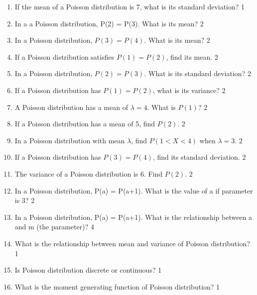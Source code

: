 \documentclass[a4paper,oneside]{book}
\begin{document}
\begin{enumerate}
\item If the mean of a Poisson distribution is 7, what is its standard deviation? \hfill 1

\item In a a Poisson distribution, P(2) = P(3). What is its mean?  \hfill 2

\item In a Poisson distribution, \( P(3) = P(4) \). What is its mean? \hfill 2

\item If a Poisson distribution satisfies \( P(1) = P(2) \), find its mean. \hfill 2

\item In a Poisson distribution, \( P(2) = P(3) \). What is its standard deviation? \hfill 2

\item If a Poisson distribution has \( P(1) = P(2) \), what is its variance? \hfill 2

\item A Poisson distribution has a mean of \( \lambda = 4 \). What is \( P(1) \)? \hfill 2

\item If a Poisson distribution has a mean of 5, find \( P(2) \). \hfill 2

\item In a Poisson distribution with mean \( \lambda \), find \( P(1 < X < 4) \) when \( \lambda = 3 \). \hfill 2

\item If a Poisson distribution has \( P(3) = P(4) \), find its standard deviation. \hfill 2

\item The variance of a Poisson distribution is 6. Find \( P(2) \). \hfill 2

 \item In a Poisson distribution, P(a) = P(a+1). What is the value of a if parameter is 3? \hfill 2

\item In a Poisson distribution, P(a) = P(a+1). What is the relationship between a and m (the parameter)? \hfill 4

\item What is the relationship between mean and variance of Poisson distribution? \hfill 1

\item Is Poisson distribution discrete or continuous? \hfill 1

\item What is the moment generating function of Poisson distribution? \hfill 1


\end{enumerate}
\end{document}
